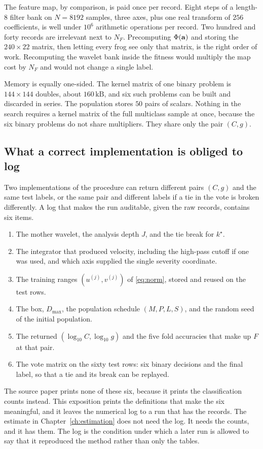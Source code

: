 The feature map, by comparison, is paid once per record.
Eight steps of a length-\(8\) filter bank on \(N=8192\) samples, three axes, plus one real transform of \(256\) coefficients, is well under \(10^{6}\) arithmetic operations per record.
Two hundred and forty records are irrelevant next to \(N_{F}\).
Precomputing \(\Phi(\mathbf{a})\) and storing the \(240\times 22\) matrix, then letting every frog see only that matrix, is the right order of work.
Recomputing the wavelet bank inside the fitness would multiply the map cost by \(N_{F}\) and would not change a single label.

Memory is equally one-sided.
The kernel matrix of one binary problem is \(144\times 144\) doubles, about \(160\,\mathrm{kB}\), and six such problems can be built and discarded in series.
The population stores \(50\) pairs of scalars.
Nothing in the search requires a kernel matrix of the full multiclass sample at once, because the six binary problems do not share multipliers.
They share only the pair \((C, g)\).

\subsection{What a correct implementation is obliged to log}

Two implementations of the procedure can return different pairs \((C, g)\) and the same test labels, or the same pair and different labels if a tie in the vote is broken differently.
A log that makes the run auditable, given the raw records, contains six items.
\begin{enumerate}
\item The mother wavelet, the analysis depth \(J\), and the tie break for \(k^{\star}\).
\item The integrator that produced velocity, including the high-pass cutoff if one was used, and which axis supplied the single severity coordinate.
\item The training ranges \((u^{(j)}, v^{(j)})\) of \eqref{eq:norm}, stored and reused on the test rows.
\item The box, \(D_{\max}\), the population schedule \((M, P, L, S)\), and the random seed of the initial population.
\item The returned \((\log_{10} C, \log_{10} g)\) and the five fold accuracies that make up \(F\) at that pair.
\item The vote matrix on the sixty test rows: six binary decisions and the final label, so that a tie and its break can be replayed.
\end{enumerate}
The source paper prints none of these six, because it prints the classification counts instead.
This exposition prints the definitions that make the six meaningful, and it leaves the numerical log to a run that has the records.
The estimate in Chapter~\ref{ch:estimation} does not need the log.
It needs the counts, and it has them.
The log is the condition under which a later run is allowed to say that it reproduced the method rather than only the tables.

